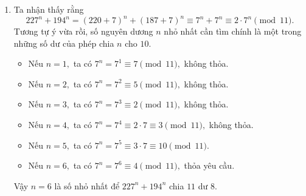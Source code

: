 \begin{gbtt}
{\begin{enumerate}[a,]
\begin{itemize}
        \item Nếu $n=3,$ ta có
        $1048^n=1048^3  \equiv 8\cdot13 \equiv 12 \pmod{23},$ không thỏa.
         \item Nếu $n=4,$ ta có
        $1048^n=1048^4 \equiv 12\cdot13 \equiv 18 \pmod{23},$ không thỏa.
        \item Nếu $n=5,$ ta có
        $1048^n=1048^5 \equiv 18\cdot13 \equiv 4 \pmod{23},$ thỏa yêu cầu.
    \end{itemize}
    Vậy $n=5$ là số nhỏ nhất để $1048^n$ chia $23$ dư $4.$
    \item Ta nhận thấy rằng
    $$227^n + 194^n=(220+7)^n+(187+7)^n \equiv 7^n + 7^n \equiv 2\cdot7^n \pmod{11}.$$
    Tương tự ý vừa rồi, số nguyên dương $n$ nhỏ nhất cần tìm chính là một trong những số dư của phép chia $n$ cho $10.$
    \begin{itemize} 
        \item Nếu $n=1,$ ta có
        $7^n=7^1 \equiv 7 \pmod{11},$ không thỏa.
        \item Nếu $n=2,$ ta có
        $7^n=7^2 \equiv 5 \pmod{11},$ không thỏa.
        \item Nếu $n=3,$ ta có
        $7^n=7^3  \equiv 2  \pmod{11},$ không thỏa.
        \item Nếu $n=4,$ ta có
        $7^n=7^4 \equiv 2\cdot7 \equiv 3 \pmod{11},$ không thỏa.
        \item Nếu $n=5,$ ta có
        $7^n=7^5 \equiv 3\cdot7 \equiv 10 \pmod{11}.$
        \item Nếu $n=6,$ ta có
        $7^n=7^6  \equiv 4  \pmod{11},$ thỏa yêu cầu.
        \end{itemize}
        Vậy $n=6$ là số nhỏ nhất để $227^n+194^n$ chia $11$ dư $8.$
\end{enumerate}
}
\end{gbtt}

